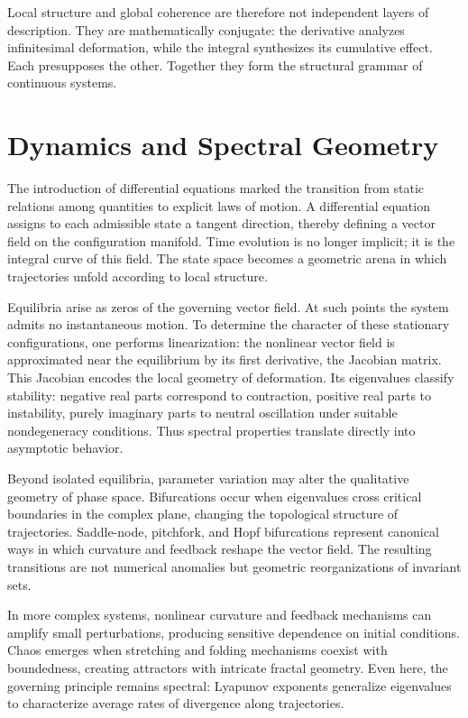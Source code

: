 \documentclass[12pt]{book}
\begin{document}
Local structure and global coherence are therefore not independent
layers of description. They are mathematically conjugate: the
derivative analyzes infinitesimal deformation, while the integral
synthesizes its cumulative effect. Each presupposes the other.
Together they form the structural grammar of continuous systems.

\section{Dynamics and Spectral Geometry}

The introduction of differential equations marked the transition from
static relations among quantities to explicit laws of motion. A
differential equation assigns to each admissible state a tangent
direction, thereby defining a vector field on the configuration
manifold. Time evolution is no longer implicit; it is the integral
curve of this field. The state space becomes a geometric arena in
which trajectories unfold according to local structure.

Equilibria arise as zeros of the governing vector field. At such
points the system admits no instantaneous motion. To determine the
character of these stationary configurations, one performs
linearization: the nonlinear vector field is approximated near the
equilibrium by its first derivative, the Jacobian matrix. This
Jacobian encodes the local geometry of deformation. Its eigenvalues
classify stability: negative real parts correspond to contraction,
positive real parts to instability, purely imaginary parts to neutral
oscillation under suitable nondegeneracy conditions. Thus spectral
properties translate directly into asymptotic behavior.

Beyond isolated equilibria, parameter variation may alter the
qualitative geometry of phase space. Bifurcations occur when
eigenvalues cross critical boundaries in the complex plane, changing
the topological structure of trajectories. Saddle-node, pitchfork,
and Hopf bifurcations represent canonical ways in which curvature and
feedback reshape the vector field. The resulting transitions are not
numerical anomalies but geometric reorganizations of invariant sets.

In more complex systems, nonlinear curvature and feedback mechanisms
can amplify small perturbations, producing sensitive dependence on
initial conditions. Chaos emerges when stretching and folding
mechanisms coexist with boundedness, creating attractors with
intricate fractal geometry. Even here, the governing principle remains
spectral: Lyapunov exponents generalize eigenvalues to characterize
average rates of divergence along trajectories.
\end{document}
